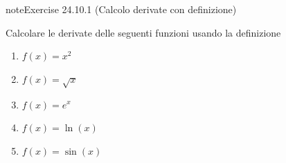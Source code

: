 \documentclass[letterpaper,10pt,italian]{jupyterBook}
\begin{document}
\begin{sphinxadmonition}{note}{Exercise 24.10.1 (Calcolo derivate con definizione)}



\sphinxAtStartPar
Calcolare le derivate delle seguenti funzioni usando la definizione
\begin{enumerate}
%
\item {} 
\sphinxAtStartPar
\(f(x) = x^2\)

\item {} 
\sphinxAtStartPar
\(f(x) = \sqrt{x}\)

\item {} 
\sphinxAtStartPar
\(f(x) = e^x\)

\item {} 
\sphinxAtStartPar
\(f(x) = \ln(x)\)

\item {} 
\sphinxAtStartPar
\(f(x) = \sin(x)\)

\end{enumerate}

\sphinxAtStartPar
{}
\end{sphinxadmonition}
 \label{exercise:ch/infinitesimal_calculus/derivatives-problems-exercise-1}
\end{document}
